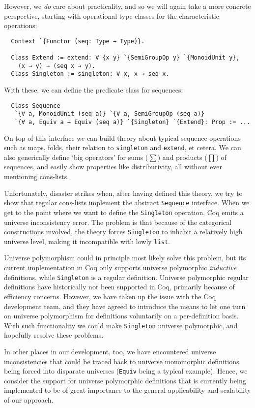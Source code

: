 \documentclass[a4paper,10pt,runningheads]{llncs}
\begin{document}
However, we \emph{do} care about practicality, and so we will again take a more concrete perspective, starting with operational type classes for the characteristic operations:
\begin{lstlisting}
  Context `{Functor (seq: Type → Type)}.

  Class Extend := extend: ∀ {x y} `{SemiGroupOp y} `{MonoidUnit y},
    (x → y) → (seq x → y).
  Class Singleton := singleton: ∀ x, x → seq x.
\end{lstlisting}
With these, we can define the predicate class for sequences:
\begin{lstlisting}
  Class Sequence
   `{∀ a, MonoidUnit (seq a)} `{∀ a, SemiGroupOp (seq a)}
   `{∀ a, Equiv a → Equiv (seq a)} `{Singleton} `{Extend}: Prop := ...
\end{lstlisting}
On top of this interface we can build theory about typical sequence operations such as maps, folds, their relation to \lstinline|singleton| and \lstinline|extend|, et cetera. We can also generically define `big operators' for sums ($\sum$) and products ($\prod$) of sequences, and easily show properties like distributivity, all without ever mentioning cons-lists.

Unfortunately, disaster strikes when, after having defined this theory, we try to show that regular cons-lists implement the abstract \lstinline|Sequence| interface. When we get to the point where we want to define the \lstinline|Singleton| operation, Coq emits a universe inconsistency error. The problem is that because of the categorical constructions involved, the theory forces \lstinline|Singleton| to inhabit a relatively high universe level, making it incompatible with lowly \lstinline|list|.

Universe polymorphism could in principle most likely solve this problem, but its current implementation in Coq only supports universe polymorphic \emph{inductive} definitions, while \lstinline|Singleton| is a regular definition. Universe polymorphic regular definitions have historically not been supported in Coq, primarily because of efficiency concerns. However, we have taken up the issue with the Coq development team, and they have agreed to introduce the means to let one turn on universe polymorphism for definitions voluntarily on a per-definition basis. With such functionality we could make \lstinline|Singleton| universe polymorphic, and hopefully resolve these problems.

In other places in our development, too, we have encountered universe inconsistencies that could be traced back to universe monomorphic definitions being forced into disparate universes (\lstinline|Equiv| being a typical example). Hence, we consider the support for universe polymorphic definitions that is currently being implemented to be of great importance to the general applicability and scalability of our approach.
 
\end{document}
